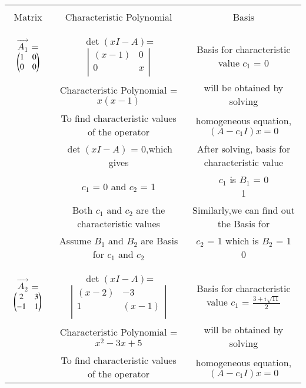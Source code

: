 \documentclass[journal,12pt,twocolumn]{IEEEtran}
\begin{document}
\begin{table*}[ht]
\begin{center}
\begin{tabular}{|c|c|c|}
\hline
& &\\
Matrix & Characteristic Polynomial & Basis\\
& &\\
\hline
& &\\
$\vec{A_1}$ = $\begin{pmatrix}1&0\\
                     0&0\end{pmatrix}$ 
& $\det(xI-A)$= $\left|
                \begin{array}{ccc}
                (x-1) & 0\\
                0 & x\\
                \end{array}
                \right|$ & Basis for characteristic value $c_1$ = 0 \\
& Characteristic Polynomial = $x(x-1)$ & will be obtained by solving\\
& To find characteristic values of the operator& homogeneous equation,$(A-c_1I)x = 0$\\
& $\det(xI-A)$ = 0,which gives & After solving, basis for characteristic value\\
& $c_1$ = 0 and $c_2$ = 1 & $c_1$ is $B_1$ = \myvec{0\\1}\\
& Both $c_1$ and $c_2$ are the characteristic values & Similarly,we can find out the Basis for\\
& Assume $B_1$ and $B_2$ are Basis for $c_1$ and $c_2$ & $c_2$ = 1 which is $B_2$ = \myvec{1\\0} \\
& &\\
\hline
& & \\
$\vec{A_2}$ = $\begin{pmatrix}2&3\\
                     -1&1\end{pmatrix}$ 
& $\det(xI-A)$= $\left|
                \begin{array}{ccc}
                (x-2) & -3\\
                1 & (x-1)\\
                \end{array}
                \right|$ & Basis for characteristic value $c_1$ = $\frac{3+i\sqrt{11}}{2}$\\
& Characteristic Polynomial = $x^2-3x+5$ & will be obtained by solving\\
& To find characteristic values of the operator& homogeneous equation,$(A-c_1I)x = 0$\\

\end{tabular}
\end{center}
\end{table*}
\end{document}
